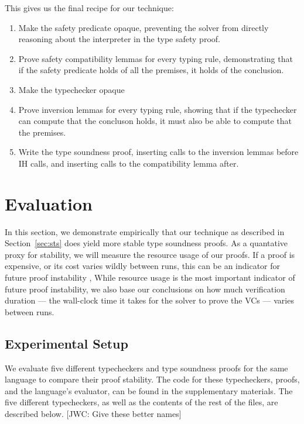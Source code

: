 \documentclass[sigplan,review,screen,anonymous]{acmart}
\newcommand{\comm}[3]{\textcolor{#1}{[#2: #3]}}
\newcommand{\jwc}[1]{\comm{dkgreen}{JWC}{#1}}
\begin{document}
This gives us the final recipe for our technique:

\begin{enumerate}
  \item Make the safety predicate opaque, preventing the solver from directly reasoning about the interpreter in the type safety proof.
  \item Prove safety compatibility lemmas for every typing rule, demonstrating that if the safety predicate holds of all the premises, it holds of the conclusion.
  \item Make the typechecker opaque
  \item Prove inversion lemmas for every typing rule, showing that if the typechecker can compute that the concluson holds, it must also be able to compute that the premises.
  \item Write the type soundness proof, inserting calls to the inversion lemmas before IH calls, and inserting calls to the compatibility lemma after.
\end{enumerate}






\section{Evaluation}
\label{sec:eval}
In this section, we demonstrate empirically that our technique as described in Section~\ref{sec:sts}
does yield more stable type soundness proofs. As a quantative proxy for stability, we will measure
the resource usage of our proofs. If a proof is expensive, or its cost varies wildly
between runs, this can be an indicator for future proof instability \cite{stabilize},\cite{tomb}
While resource usage is the most important indicator of future proof instability, we also
base our conclusions on how much verification duration --- the wall-clock time it takes for the solver
to prove the VCs --- varies between runs.

\subsection*{Experimental Setup}
We evaluate five different typecheckers and type soundness proofs for the same
language to compare their proof stability.  The code for these typecheckers, proofs, and the language's evaluator, can be found in
the supplementary materials. The five different typecheckers, as well as the contents of the rest of the files, are described below.
\jwc{Give these better names}
\end{document}
